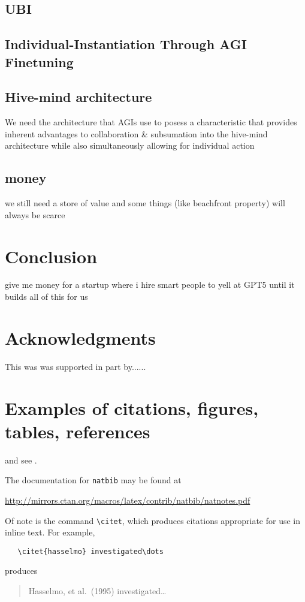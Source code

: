\documentclass{article}
\begin{document}
\subsection{UBI}

\subsection{Individual-Instantiation Through AGI Finetuning}

\subsection{Hive-mind architecture}
We need the architecture that AGIs use to posess a characteristic that provides inherent advantages to collaboration \& subsumation into the hive-mind architecture while also simultaneously allowing for individual action

\subsection{money}
we still need a store of value and some things (like beachfront property) will always be scarce



\section{Conclusion}
give me money for a startup where i hire smart people to yell at GPT5 until it builds all of this for us

\section*{Acknowledgments}
This was was supported in part by......


\section{Examples of citations, figures, tables, references}
\label{sec:others}
\lipsum[8] \cite{kour2014real,kour2014fast} and see \cite{hadash2018estimate}.

The documentation for \verb+natbib+ may be found at
\begin{center}
  \url{http://mirrors.ctan.org/macros/latex/contrib/natbib/natnotes.pdf}
\end{center}
Of note is the command \verb+\citet+, which produces citations
appropriate for use in inline text.  For example,
\begin{verbatim}
   \citet{hasselmo} investigated\dots
\end{verbatim}
produces
\begin{quote}
  Hasselmo, et al.\ (1995) investigated\dots
\end{quote}
\end{document}
